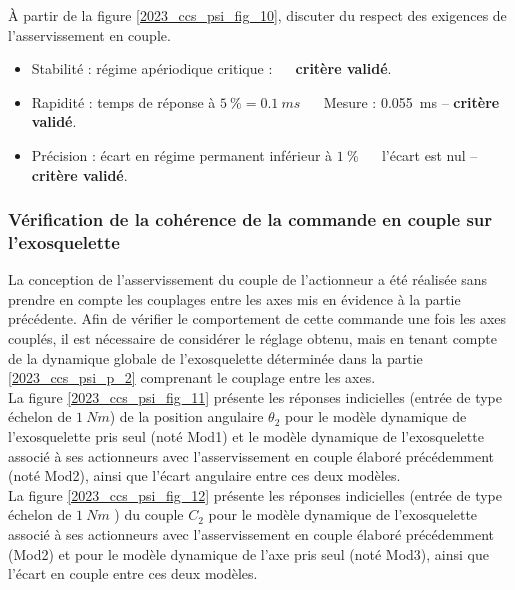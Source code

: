 \begin{question}
\label{2023_ccs_psi_q_20}
À partir de la figure \ref{2023_ccs_psi_fig_10}, discuter du respect des exigences de l'asservissement en couple.
\end{question}
\ifprof
\begin{corrige}
\begin{itemize}
\item Stabilité : régime apériodique critique : $\quad$ \textbf{critère validé}.
\item Rapidité : temps de réponse à $\SI{5}{\%} =\SI{0,1}{ms}$ $\quad$ Mesure : \SI{0,055}{ms} --  \textbf{critère validé}.
\item Précision : écart en régime permanent inférieur à $\SI{1}{\%}$ $\quad$ l'écart est nul -- \textbf{critère validé}.
\end{itemize}

\end{corrige}
\else
\fi



\subsubsection{Vérification de la cohérence de la commande en couple sur l'exosquelette}

\ifprof
\else

La conception de l'asservissement du couple de l'actionneur a été réalisée sans prendre en compte les couplages entre les axes mis en évidence à la partie précédente. Afin de vérifier le comportement de cette commande une fois les axes couplés, il est nécessaire de considérer le réglage obtenu, mais en tenant compte de la dynamique globale de l'exosquelette déterminée dans la partie \ref{2023_ccs_psi_p_2} comprenant le couplage entre les axes.\\
La figure \ref{2023_ccs_psi_fig_11} présente les réponses indicielles (entrée de type échelon de $\SI{1}{Nm}$) de la position angulaire $\theta_{2}$ pour le modèle dynamique de l'exosquelette pris seul (noté Mod1) et le modèle dynamique de l'exosquelette associé à ses actionneurs avec l'asservissement en couple élaboré précédemment (noté Mod2), ainsi que l'écart angulaire entre ces deux modèles.\\
La figure \ref{2023_ccs_psi_fig_12} présente les réponses indicielles (entrée de type échelon de $\SI{1}{Nm}$ ) du couple $C_{2}$ pour le modèle dynamique de l'exosquelette associé à ses actionneurs avec l'asservissement en couple élaboré précédemment (Mod2) et pour le modèle dynamique de l'axe pris seul (noté Mod3), ainsi que l'écart en couple entre ces deux modèles.\\


